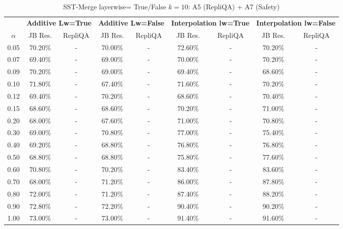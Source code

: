 \begin{table}[h]
\centering
\caption{SST-Merge layerwise= True/False $k=10$: A5 (RepliQA) + A7 (Safety)}
\label{tab:res_a5_a7_sst_10}
\begin{tabular}{c|cc|cc|cc|cc}
\hline
 & \multicolumn{2}{c|}{\textbf{Additive Lw=True}} & \multicolumn{2}{c|}{\textbf{Additive Lw=False}} & \multicolumn{2}{c|}{\textbf{Interpolation lw=True}}& \multicolumn{2}{c}{\textbf{Interpolation lw=False}} \\
$\alpha$ & JB Res. & RepliQA & JB Res. & RepliQA & JB Res. & RepliQA & JB Res. & RepliQA \\
\hline
0.05 & 70.20\% & - & 70.00\% & - & 72.60\% & - & 70.20\% & - \\
0.07 & 69.40\% & - & 69.00\% & - & 70.00\% & - & 70.20\% & - \\
0.09 & 70.20\% & - & 69.00\% & - & 69.40\% & - & 68.60\% & - \\
0.10 & 71.80\% & - & 67.40\% & - & 71.60\% & - & 70.20\% & - \\
0.12 & 69.40\% & - & 70.20\% & - & 68.60\% & - & 70.40\% & - \\
0.15 & 68.60\% & - & 68.60\% & - & 70.20\% & - & 71.00\% & - \\
0.20 & 68.00\% & - & 67.60\% & - & 71.00\% & - & 70.80\% & - \\
0.30 & 69.00\% & - & 70.80\% & - & 77.00\% & - & 75.40\% & - \\
0.40 & 69.20\% & - & 68.80\% & - & 76.80\% & - & 76.80\% & - \\
0.50 & 68.80\% & - & 68.80\% & - & 75.80\% & - & 77.60\% & - \\
0.60 & 70.80\% & - & 70.20\% & - & 83.40\% & - & 83.60\% & - \\
0.70 & 68.00\% & - & 71.20\% & - & 86.00\% & - & 87.80\% & - \\
0.80 & 72.00\% & - & 71.20\% & - & 87.40\% & - & 88.20\% & - \\
0.90 & 72.80\% & - & 72.20\% & - & 90.40\% & - & 90.20\% & - \\
1.00 & 73.00\% & - & 73.00\% & - & 91.40\% & - & 91.60\% & - \\
\hline
\end{tabular}
\end{table}
\FloatBarrier

